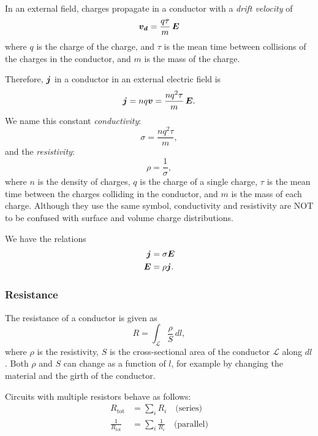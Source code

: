         In an external field, charges propagate in a conductor with a \textit{drift velocity} of
        \begin{equation}
            \bm{v_d} = \frac{q\tau}{m}\,\bm{E}
        \end{equation}
        where $q$ is the charge of the charge, and $\tau$ is the mean time between collisions of the charges in the conductor, 
        and $m$ is the mass of the charge.
        
        Therefore, $\bm{j}$ in a conductor in an external electric field is
        \begin{equation}
            \bm{j} = nq\bm{v} = \frac{nq^2\tau}{m}\,\bm{E}.
        \end{equation}
        We name this constant \textit{conductivity}: 
        \begin{equation}
            \sigma = \frac{nq^2\tau}{m},
        \end{equation}
        and the \textit{resistivity}:
        \begin{equation}
            \rho = \frac{1}{\sigma},
        \end{equation}
        where $n$ is the density of charges, $q$ is the charge of a single charge, 
        $\tau$ is the mean time between the charges colliding in the conductor, and $m$ is the mass of each charge. 
        Although they use the same symbol, conductivity and resistivity are NOT to be confused with surface and volume charge distributions.
        
        We have the relations 
        \begin{align}
            \bm{j} &= \sigma \bm{E} \\
            \bm{E} &= \rho \bm{j}.
        \end{align}
    
    \subsubsection{Resistance}
        The resistance of a conductor is given as
        \begin{equation}
            R = \int_\mathcal{L} \frac{\rho}{S}\, dl,
        \end{equation}
        where $\rho$ is the resistivity, 
        $S$ is the cross-sectional area of the conductor $\mathcal{L}$ along $dl$. 
        Both $\rho$ and $S$ can change as a function of $l$, for example by changing the material and the girth of the conductor.
        
        Circuits with multiple resistors behave as follows: 
        \begin{align}
            R_{\text{tot}} &= \sum_i R_i\quad \text{(series)} \\
            \frac{1}{R_{\text{tot}}} &= \sum_i \frac{1}{R_i} \quad\text{(parallel)}
        \end{align}
        

